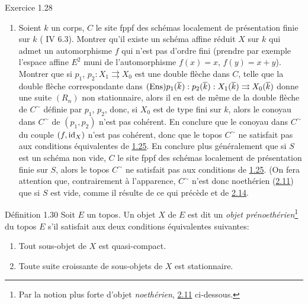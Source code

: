\documentclass[10pt]{../fichiers-configuration-latex/smfart}
\begin{document}
\begin{enonce*}[remark]{Exercice 1.28}
\begin{enumerate}
\item Soient $k$ un corps, $C$ le site fppf des schémas localement de
  présentation finie sur $k$ ( IV 6.3). Montrer qu'il existe un
  schéma affine réduit $X$ sur $k$ qui admet un automorphisme $f$ qui
  n'est pas d'ordre fini (prendre par exemple l'espace affine $E^2$
  muni de l'automorphisme $f(x) = x$, $f(y) = x + y$).\pageoriginale
  Montrer que si
   $p_1$, $p_2 : X_1 \rightrightarrows X_0$ est une double flèche dans
  $C$, telle que la double flèche correspondante dans $(\operatorname{Ens}) p_1
  (\overline{k}):p_2(\overline{k}): X_1(\overline{k}) \rightrightarrows X_0
  (\overline{k})$ donne une suite $(R_n)$ non stationnaire, alors il en
  est de même de la double flèche de $C^{\sim}$ définie par $p_1$,
  $p_2$, donc, si $X_0$ est de type fini sur $k$, alors le conoyau
  dans $C^{\sim}$ de $(p_1, p_2)$ n'est pas cohérent. En conclure que
  le conoyau dans $C^{\sim}$ du couple $(f, \operatorname{id}_X)$ n'est pas
  cohérent, donc que le topos $C^{\sim}$ ne satisfait pas aux
  conditions équivalentes de \hyperref[VI.cor1.25]{1.25}. En conclure plus généralement que
  si $S$ est un schéma non vide, $C$ le site fppf des schémas
  localement de présentation finie sur $S$, alors le topos $C^{\sim}$
  ne satisfait pas aux conditions de \hyperref[VI.cor1.25]{1.25}. (On fera attention que,
  contrairement à l'apparence, $C^{\sim}$ n'est donc noethérien (\hyperref[VI.def2.11]{2.11})
  que si $S$ est vide, comme il résulte de ce qui précède et de \hyperref[VI.subsec2.14]{2.14}.
\end{enumerate}
\end{enonce*}

\begin{enonce*}{Définition 1.30}
Soit $E$ un topos. Un objet $X$ de $E$ est dit un \emph{objet
prénoethérien}\footnote{Par la notion plus forte d'objet
  \emph{noethérien}, \cf \hyperref[VI.def2.11]{2.11} ci-dessous.} du topos $E$ s'il satisfait
aux deux conditions équivalentes suivantes:
\begin{enumerate}
\renewcommand{\theenumi}{\roman{enumi}}
\renewcommand{\labelenumi}{(\theenumi)}

\item Tout sous-objet de $X$ est quasi-compact.

\item Toute suite croissante de sous-objets de $X$ est stationnaire.
\end{enumerate}
\end{enonce*}

\setcounter{subsection}{30}
\setcounter{subsubsection}{0}
\end{document}

